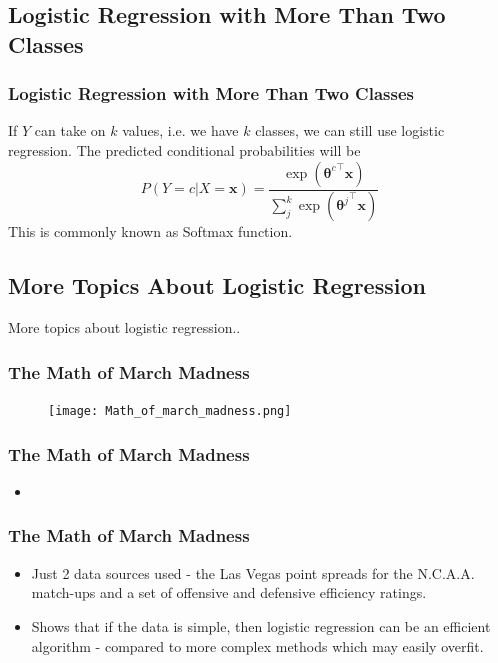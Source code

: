 \subsection{Logistic Regression with More Than Two Classes}
\begin{frame}
\frametitle{Logistic Regression with More Than Two Classes}
If $Y$ can take on $k$ values, i.e. we have $k$ classes, we can still use logistic regression. The predicted conditional probabilities will be 
\begin{equation}
P(Y = c | X = \mathbf{x}) = \frac{\exp ({{\bm{\theta}}^{c}}^ {\intercal} \mathbf{x})} { \sum_{j}^{k} \exp({{\bm{\theta}}^{j}}^ {\intercal}\mathbf{x}) }
\end{equation}
This is commonly known as Softmax function.
\end{frame}
\subsection{More Topics About Logistic Regression}
\begin{frame}
\large{\centerline{More topics about logistic regression..}}
\end{frame}

\begin{frame}
\frametitle{The Math of March Madness}
\begin{figure}
\texttt{[image: Math\_of\_march\_madness.png]}
\end{figure}
\end{frame}

\begin{frame}
\frametitle{The Math of March Madness}
\begin{itemize}
\item {}
\end{itemize}
\end{frame}

\begin{frame}
\frametitle{The Math of March Madness}
\begin{itemize}
\item Just 2 data sources used - the Las Vegas point spreads for the N.C.A.A. match-ups and a set of offensive and defensive efficiency ratings. 
\item Shows that if the data is simple, then logistic regression can be an efficient algorithm - compared to more complex methods which may easily overfit.
\end{itemize}
\end{frame}

